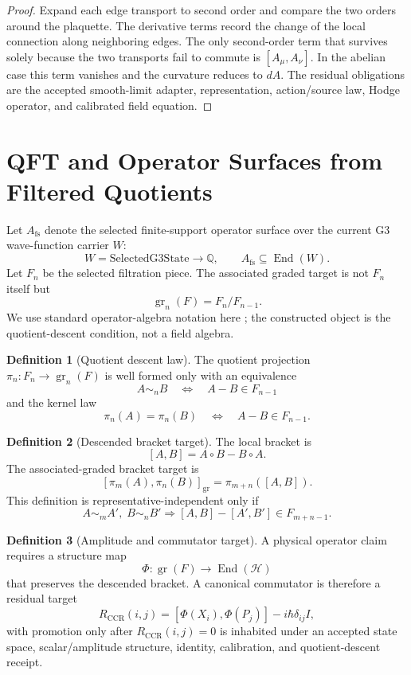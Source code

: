 \documentclass[11pt]{article}
\theoremstyle{definition}
\newtheorem{definition}{Definition}[section]
\theoremstyle{plain}
\theoremstyle{remark}
\begin{document}
\begin{proof}
Expand each edge transport to second order and compare the two orders around
the plaquette. The derivative terms record the change of the local connection
along neighboring edges. The only second-order term that survives solely
because the two transports fail to commute is \([A_\mu,A_\nu]\). In the
abelian case this term vanishes and the curvature reduces to \(dA\). The
residual obligations are the accepted smooth-limit adapter, representation,
action/source law, Hodge operator, and calibrated field equation.
\end{proof}

\section{QFT and Operator Surfaces from Filtered Quotients}

Let \(A_{\mathrm{fs}}\) denote the selected finite-support operator surface
over the current G3 wave-function carrier \(W\):
\[
W=\mathrm{SelectedG3State}\to\mathbb Q,
\qquad
A_{\mathrm{fs}}\subseteq \operatorname{End}(W).
\]
Let \(F_n\) be the selected filtration piece. The associated graded target is
not \(F_n\) itself but
\[
\operatorname{gr}_n(F)=F_n/F_{n-1}.
\]
We use standard operator-algebra notation here
\cite{haag-1996,reed-simon-1980,weinberg-1995}; the constructed object is the
quotient-descent condition, not a field algebra.

\begin{definition}[Quotient descent law]
The quotient projection
\(\pi_n:F_n\to\operatorname{gr}_n(F)\) is well formed only with an equivalence
\[
A\sim_n B \quad\Longleftrightarrow\quad A-B\in F_{n-1}
\]
and the kernel law
\[
\pi_n(A)=\pi_n(B)
\quad\Longleftrightarrow\quad
A-B\in F_{n-1}.
\]
\end{definition}

\begin{definition}[Descended bracket target]
The local bracket is
\[
[A,B]=A\circ B-B\circ A.
\]
The associated-graded bracket target is
\[
[\pi_m(A),\pi_n(B)]_{\mathrm{gr}}
=
\pi_{m+n}([A,B]).
\]
This definition is representative-independent only if
\[
A\sim_m A',\;B\sim_n B'
\Rightarrow
[A,B]-[A',B']\in F_{m+n-1}.
\]
\end{definition}

\begin{definition}[Amplitude and commutator target]
A physical operator claim requires a structure map
\[
\Phi:\operatorname{gr}(F)\to \operatorname{End}(\mathcal H)
\]
that preserves the descended bracket. A canonical commutator is therefore a
residual target
\[
R_{\mathrm{CCR}}(i,j)=
[\Phi(X_i),\Phi(P_j)]-i\hbar\delta_{ij}I,
\]
with promotion only after \(R_{\mathrm{CCR}}(i,j)=0\) is inhabited under an
accepted state space, scalar/amplitude structure, identity, calibration, and
quotient-descent receipt.
\end{definition}
\end{document}

